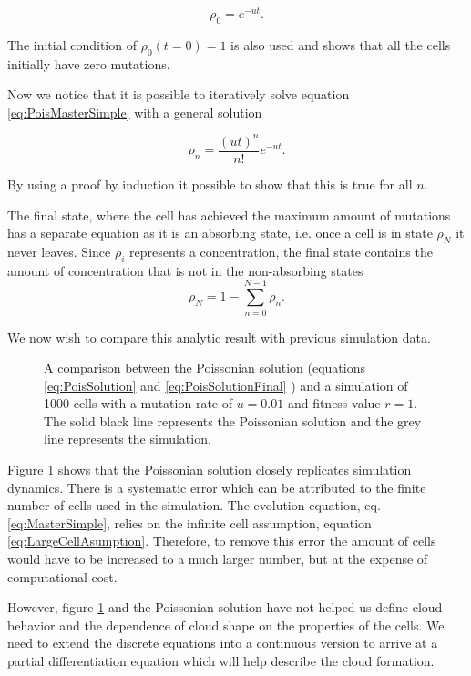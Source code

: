 \documentclass[12pt, a4paper,]{article}
\begin{document}
\begin{equation}
\rho _0 = e^{-ut} .
\end{equation}

The initial condition of $\rho _0 (t=0) = 1 $ is also used and shows that all the cells initially have zero mutations. 

Now we notice that it is possible to iteratively solve equation \eqref{eq:PoisMasterSimple} with a general solution

\begin{equation}
\rho _n  = \frac{(u t)^n}{n!} e^{-ut}.
\label{eq:PoisSolution}
\end{equation}

By using a proof by induction it possible to show that this is true for all $n$.
 
The final state, where the cell has achieved the maximum amount of mutations has a separate equation as it is an absorbing state, i.e. once a cell is in state $\rho _N$ it never leaves. Since $\rho _i$ represents a concentration, the final state contains the amount of concentration that is not in the non-absorbing states
\begin{equation}
\rho _N = 1 - \sum _{n=0} ^{N-1} \rho _n.
\label{eq:PoisSolutionFinal}
\end{equation}

We now wish to compare this analytic result with previous simulation data. 
 
\begin{figure}[H]
	\centering
		
	\caption{A comparison between the Poissonian solution (equations \eqref{eq:PoisSolution} and \eqref{eq:PoisSolutionFinal} ) and a simulation of 1000 cells with a mutation rate of $u= 0.01 $ and fitness value $r = 1$. The solid black line represents the Poissonian solution and the grey line represents the simulation.  }
\label{fig:PoisSim}
\end{figure}

Figure \ref{fig:PoisSim} shows that the Poissonian solution closely replicates simulation dynamics. There is a systematic error which can be attributed to the finite number of cells used in the simulation. The evolution equation, eq. \eqref{eq:MasterSimple}, relies on the infinite cell assumption, equation \eqref{eq:LargeCellAsumption}. Therefore, to remove this error the amount of cells would have to be increased to a much larger number, but at the expense of computational cost. 

However, figure \ref{fig:PoisSim} and the Poissonian solution have not helped us define cloud behavior and the dependence of cloud shape on the properties of the cells. We need to extend the discrete equations into a continuous version to arrive at a partial differentiation equation which will help describe the cloud formation. 
\end{document}
